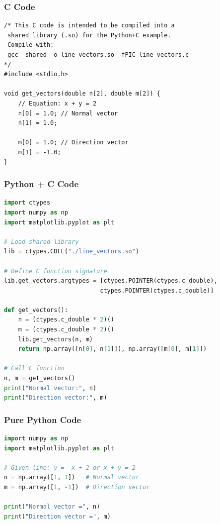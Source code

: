 \documentclass{beamer}
\begin{document}
\begin{frame}[fragile]
    \frametitle{C Code}
    \begin{lstlisting}
/* This C code is intended to be compiled into a
 shared library (.so) for the Python+C example.
 Compile with:
 gcc -shared -o line_vectors.so -fPIC line_vectors.c
*/
#include <stdio.h>

void get_vectors(double n[2], double m[2]) {
    // Equation: x + y = 2
    n[0] = 1.0; // Normal vector
    n[1] = 1.0;
    
    m[0] = 1.0; // Direction vector
    m[1] = -1.0;
}
    \end{lstlisting}
\end{frame}

\begin{frame}[fragile]
    \frametitle{Python + C Code}
    \begin{lstlisting}[language=Python]
import ctypes
import numpy as np
import matplotlib.pyplot as plt

# Load shared library
lib = ctypes.CDLL("./line_vectors.so")

# Define C function signature
lib.get_vectors.argtypes = [ctypes.POINTER(ctypes.c_double),
                           ctypes.POINTER(ctypes.c_double)]

def get_vectors():
    n = (ctypes.c_double * 2)()
    m = (ctypes.c_double * 2)()
    lib.get_vectors(n, m)
    return np.array([n[0], n[1]]), np.array([m[0], m[1]])

# Call C function
n, m = get_vectors()
print("Normal vector:", n)
print("Direction vector:", m)
    \end{lstlisting}
\end{frame}

\begin{frame}[fragile]
    \frametitle{Pure Python Code}
    \begin{lstlisting}[language=Python]
import numpy as np
import matplotlib.pyplot as plt

# Given line: y = -x + 2 or x + y = 2
n = np.array([1, 1])   # Normal vector
m = np.array([1, -1])  # Direction vector

print("Normal vector =", n)
print("Direction vector =", m)
    \end{lstlisting}
\end{frame}
\end{document}
